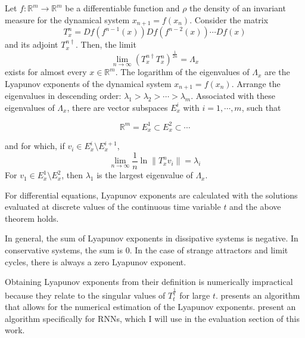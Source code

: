 \begin{theorem}
    Let $f:\mathbb{R}^m \rightarrow \mathbb{R}^m$ be a differentiable function and $\rho$ the density of an invariant measure for the dynamical system
    $x_{n+1} = f(x_n)$. Consider the matrix
    \begin{equation}
        T^n_x = Df(f^{n-1}(x))Df(f^{n-2}(x))\cdots Df(x)
    \end{equation}
    and its adjoint $T^{n\dag}_x$. Then, the limit 
    \begin{equation}
        \lim_{n\rightarrow\infty}(T^{n\dag}_x T^n_x)^{\frac{1}{2n}} = \Lambda_x
    \end{equation}
    exists for almost every $x\in \mathbb{R}^m$. The logarithm of the eigenvalues of $\Lambda_x$ are the Lyapunov exponents of the dynamical system $x_{n+1} = f(x_n)$. 
    Arrange the eigenvalues in descending order: $\lambda_1 > \lambda_2 > \cdots > \lambda_m$. Associated with these eigenvalues of $\Lambda_x$, 
    there are vector subspaces $E^i_x$ with $i=1, \cdots, m$, such that 

    \begin{equation*}
        \mathbb{R}^m = E^1_x \subset E^2_x \subset \cdots 
    \end{equation*}

    and for which, if $v_i \in E^i_x \setminus E^{i+1}_x$, 
    \begin{equation*}
        \lim_{n \rightarrow \infty} \frac{1}{n} \ln \left\| T^n_x v_i \right\| = \lambda_i
    \end{equation*}
    For $v_1 \in E^1_x\setminus E^2_x$, then $\lambda_1$ is the largest eigenvalue of $\Lambda_x$. 
\end{theorem}

For differential equations, Lyapunov exponents are calculated with the solutions evaluated at discrete values of the continuous time variable $t$ and the above theorem holds.

In general, the sum of Lyapunov exponents in dissipative systems is negative. In conservative systems, the sum is 0. In the case of strange attractors and limit cycles,
there is always a zero Lyapunov exponent.

Obtaining Lyapunov exponents from their definition is numerically impractical because they relate to the singular values of $T^{\frac{1}{t}}_t$ for large $t$. \cite{benettin1980lyapunov}
presents an algorithm that allows for the numerical estimation of the Lyapunov exponents. \cite{vogt2022lyapunov} present an algorithm specifically for RNNs, which I will use
in the evaluation section of this work. 